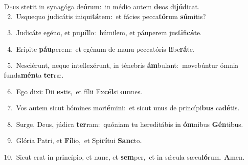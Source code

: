 \lettrine{\initial\textcolor{\initialcolor}{D}}{eus} stetit in synagóga de\-\textbf{ó}\-rum:~\star in médio autem \textbf{de}\-os di\-\textbf{jú}\-dicat.\\
{\numbfont\textcolor{\numbcolor}{~2.}}~Usquequo judicátis iniqui\-\textbf{tá}\-tem:~\star et fácies pecca\-\textbf{tó}\-rum \textbf{sú}\-mitis?\par
{\numbfont\textcolor{\numbcolor}{~3.}}~Judicáte egéno, et pu\-\textbf{píl}\-lo:~\star húmilem, et páuperem jus\-\textbf{ti}\-fi\-\textbf{cá}\-te.\par
{\numbfont\textcolor{\numbcolor}{~4.}}~Erípite \textbf{páu}\-perem:~\star et egénum de manu peccatóris \textbf{li}\-be\-\textbf{rá}\-te.\par
{\numbfont\textcolor{\numbcolor}{~5.}}~Nesciérunt, neque intellexérunt, in ténebris \textbf{ám}\-bulant:~\star movebúntur ómnia funda\-\textbf{mén}\-ta \textbf{ter}\-ræ.\par
{\numbfont\textcolor{\numbcolor}{~6.}}~Ego dixi: Dii \textbf{es}\-tis,~\star et fílii Ex\-\textbf{cél}\-si \textbf{om}\-nes.\par
{\numbfont\textcolor{\numbcolor}{~7.}}~Vos autem sicut hómines mori\-\textbf{é}\-mini:~\star et sicut unus de princípi\textbf{bus} ca\-\textbf{dé}\-tis.\par
{\numbfont\textcolor{\numbcolor}{~8.}}~Surge, Deus, júdica \textbf{ter}\-ram:~\star quóniam tu hereditábis in \textbf{óm}\-nibus \textbf{Gén}\-tibus.\par
{\numbfont\textcolor{\numbcolor}{~9.}}~Glória Patri, et \textbf{Fí}\-lio,~\star et Spi\-\textbf{rí}\-tui \textbf{Sanc}\-to.\par
{\numbfont\textcolor{\numbcolor}{10.}}~Sicut erat in princípio, et nunc, et \textbf{sem}\-per,~\star et in sǽcula sæcu\-\textbf{ló}\-rum. \textbf{A}\-men.\par
